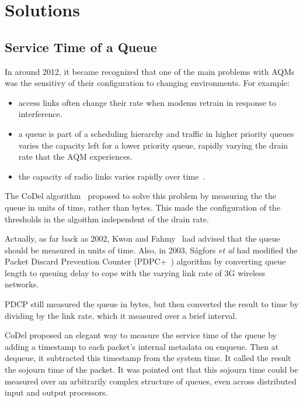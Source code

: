 \section{Solutions}\label{sigqdyntr_solutions}

\subsection{Service Time of a Queue}\label{sec:svc_time}

In around 2012, it became recognized that one of the main problems with AQMs was the sensitivy of their  configuration to changing environments. For example:
\begin{itemize}
	\item access links often change their rate when modems retrain in response to interference. 
	\item a queue is part of a scheduling hierarchy and traffic in higher priority queues varies the capacity left for a lower priority queue, rapidly varying the drain rate that the AQM experiences.
	\item the capacity of radio links varies rapidly over time~\cite{McGregor10:Minstrel_TR}.
\end{itemize}

The CoDel algorithm~\cite{Nichols12:CoDel} proposed to solve this problem by measuring the the queue in units of time, rather than bytes. This made the configuration of the thresholds in the algoithm independent of the drain rate.

Actually, as far back as 2002, 
Kwon and Fahmy~\cite{Kwon02:Load_v_Queue_AQM} had advised that the queue should 
be measured in units of time. Also, in 2003, S{\aa}gfors \emph{et al} had 
modified the Packet Discard Prevention Counter (PDPC+~\cite{Sagfors03:PDPC_vary}) 
algorithm by converting queue length to queuing delay to cope with the varying 
link rate of 3G wireless networks.

PDCP still measured the queue in bytes, but then converted the result to time by dividing by the link rate, which it measured over a brief interval. 

CoDel proposed an elegant way to measure the service time of the queue by adding a timestamp to each packet's internal metadata on enqueue. Then at dequeue, it subtracted this timestamp from the system time. It called the result the sojourn time of the packet. It was pointed out that this sojourn time could be measured over an arbitrarily complex structure of queues, even across distributed input and output processors.

